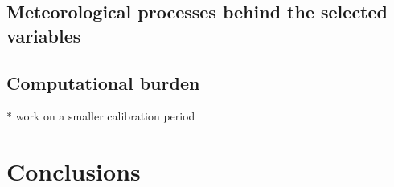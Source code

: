 \documentclass[draft]{agujournal2019}
\begin{document}


\subsection{Meteorological processes behind the selected variables}
\label{discussion_meteo}


\subsection{Computational burden}

* work on a smaller calibration period


\section{Conclusions}
\label{conclusions}




%
%
%
%
%
%
%
%
%
%
\end{document}
